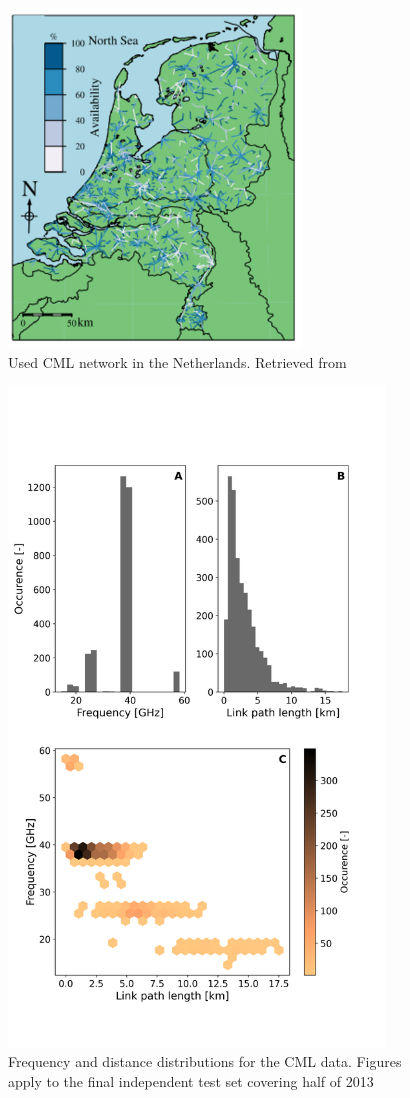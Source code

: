 \documentclass[twocolumn, 10pt, a4paper]{memoir}
\begin{document}
	\begin{figure}[h]
		\includegraphics[height= 9cm]{Dutch_CML_network}
		\caption{Used CML network in the Netherlands. Retrieved from \protect{}}
		\label{fig: cmlnetworkmaps}	
	\end{figure}
	
	\begin{figure}[h]
		\includegraphics[width=10cm]{val_freq_dist}
		\caption{Frequency and distance distributions for the CML data. Figures apply to the final independent test set covering half of 2013}
		\label{fig: CML validation}
	\end{figure}
	
\end{document}
